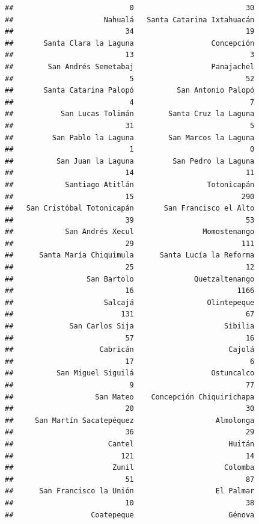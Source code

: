 \documentclass[
]{article}
\begin{document}
\begin{verbatim}
##                           0                          30 
##                     Nahualá   Santa Catarina Ixtahuacán 
##                          34                          19 
##       Santa Clara la Laguna                  Concepción 
##                          13                           3 
##        San Andrés Semetabaj                  Panajachel 
##                           5                          52 
##       Santa Catarina Palopó          San Antonio Palopó 
##                           4                           7 
##           San Lucas Tolimán        Santa Cruz la Laguna 
##                          31                           5 
##         San Pablo la Laguna        San Marcos la Laguna 
##                           1                           0 
##          San Juan la Laguna         San Pedro la Laguna 
##                          14                          11 
##            Santiago Atitlán                 Totonicapán 
##                          15                         290 
##   San Cristóbal Totonicapán       San Francisco el Alto 
##                          39                          53 
##            San Andrés Xecul                Momostenango 
##                          29                         111 
##      Santa María Chiquimula      Santa Lucía la Reforma 
##                          25                          12 
##                 San Bartolo              Quetzaltenango 
##                          16                        1166 
##                     Salcajá                 Olintepeque 
##                         131                          67 
##             San Carlos Sija                     Sibilia 
##                          57                          16 
##                    Cabricán                      Cajolá 
##                          17                           6 
##          San Miguel Siguilá                  Ostuncalco 
##                           9                          77 
##                   San Mateo    Concepción Chiquirichapa 
##                          20                          30 
##     San Martín Sacatepéquez                   Almolonga 
##                          36                          29 
##                      Cantel                      Huitán 
##                         121                          14 
##                       Zunil                     Colomba 
##                          51                          87 
##      San Francisco la Unión                   El Palmar 
##                          10                          38 
##                  Coatepeque                      Génova 

\end{verbatim}
\end{document}
